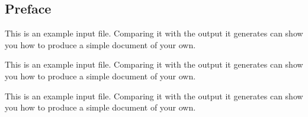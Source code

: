 \cleardoublepage
\begin{frontmatter}
\chapter*{Preface}%
\end{frontmatter}

This is an example input file.  Comparing it with
the output it generates can show you how to
produce a simple document of your own.

This is an example input file.  Comparing it with
the output it generates can show you how to
produce a simple document of your own.

This is an example input file.  Comparing it with
the output it generates can show you how to
produce a simple document of your own.

\source%
{%
  \author{Author Name}\\%
}
